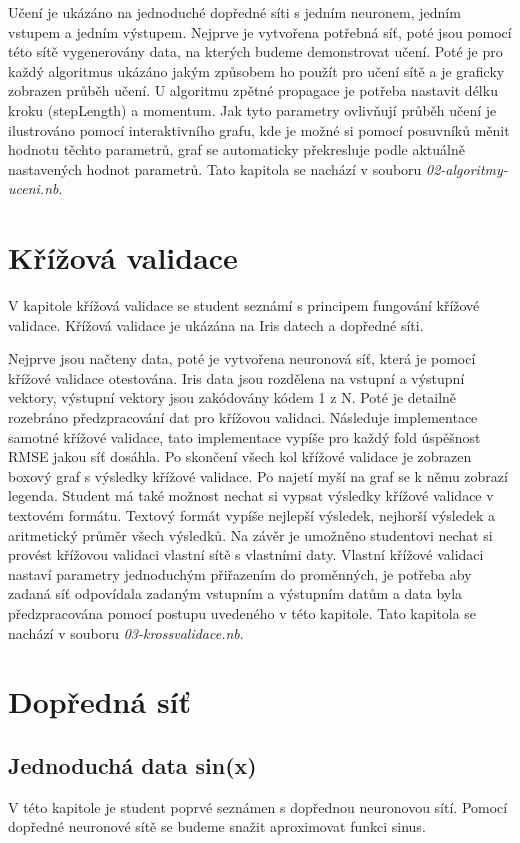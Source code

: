 \documentclass[11pt,twoside,a4paper]{book}
\begin{document}
 Učení je ukázáno na jednoduché dopředné síti s jedním neuronem, jedním vstupem a jedním výstupem. Nejprve je vytvořena potřebná síť, poté jsou pomocí této sítě vygenerovány data, na kterých budeme demonstrovat učení. Poté je pro každý algoritmus ukázáno jakým způsobem ho použít pro učení sítě a je graficky zobrazen průběh učení. U algoritmu zpětné propagace je potřeba nastavit délku kroku (stepLength) a momentum. Jak tyto parametry ovlivňují průběh učení je ilustrováno pomocí interaktivního grafu, kde je možné si pomocí posuvníků měnit hodnotu těchto parametrů, graf se automaticky překresluje podle aktuálně nastavených hodnot parametrů. Tato kapitola se nachází v souboru \textit{02-algoritmy-uceni.nb}.
\section{Křížová validace}
V kapitole křížová validace se student seznámí s principem fungování křížové validace. Křížová validace je ukázána na Iris datech a dopředné síti.

Nejprve jsou načteny data, poté je vytvořena neuronová síť, která je pomocí křížové validace otestována. Iris data jsou rozdělena na vstupní a výstupní vektory, výstupní vektory jsou zakódovány kódem 1 z N. Poté je detailně rozebráno předzpracování dat pro křížovou validaci. Následuje implementace samotné křížové validace, tato implementace vypíše pro každý fold úspěšnost RMSE jakou síť dosáhla. Po skončení všech kol křížové validace je zobrazen boxový graf s výsledky křížové validace. Po najetí myší na graf se k němu zobrazí legenda. Student má také možnost nechat si vypsat výsledky křížové validace v textovém formátu. Textový formát vypíše nejlepší výsledek, nejhorší výsledek a aritmetický průměr všech výsledků. Na závěr je umožněno studentovi nechat si provést křížovou validaci vlastní sítě s vlastními daty. Vlastní křížové validaci nastaví parametry jednoduchým přiřazením do proměnných, je potřeba aby  zadaná síť odpovídala zadaným vstupním a výstupním datům a data byla předzpracována pomocí postupu uvedeného v této kapitole. Tato kapitola se nachází v souboru \textit{03-krossvalidace.nb}.
\section{Dopředná síť}
\subsection{Jednoduchá data sin(x)}
V této kapitole je student poprvé seznámen s dopřednou neuronovou sítí. Pomocí dopředné neuronové sítě se budeme snažit aproximovat funkci sinus.
\end{document}
